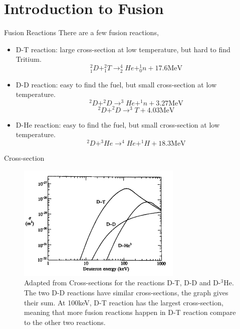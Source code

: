 \section{Introduction to Fusion}
\begin{frame}{Fusion Reactions}
	There are a few fusion reactions,
	\begin{itemize}
		\item D-T reaction: large cross-section at low temperature, but hard to find Tritium.
		      \[ ^2_1D + ^2_1T \rightarrow ^4_2He + ^1_0n + 17.6\text{MeV} \]
		\item D-D reaction: easy to find the fuel, but small cross-section at low temperature.
		      \[ ^2D + ^2D \rightarrow ^3He + ^1n + 3.27\text{MeV} \]
		      \[ ^2D + ^2D \rightarrow ^3T + 4.03\text{MeV} \]
		\item D-He reaction: easy to find the fuel, but small cross-section at low temperature.
		      \[ ^2D + ^3He \rightarrow ^4He + ^1H + 18.3\text{MeV} \]
	\end{itemize}
\end{frame}

\begin{frame}{Cross-section}
	\begin{figure}
		\centering
		\includegraphics[width=0.7\textwidth]{figures/cross-sections.png}
		\caption{Adapted from \cite{wesson_campbell_tokamaks_2011} Cross-sections for the reactions D-T, D-D and D-$^3$He. The two D-D reactions have similar cross-sections, the graph gives their sum. At 100keV, D-T reaction has the largest cross-section, meaning that more fusion reactions happen in D-T reaction compare to the other two reactions.}
		\label{fig:cross-sections}
	\end{figure}
\end{frame}

